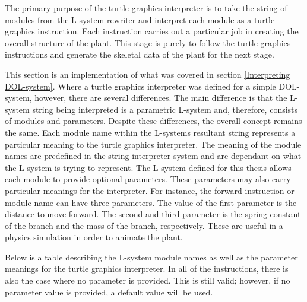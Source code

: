 The primary purpose of the turtle graphics interpreter is to take the string of modules from the L-system rewriter and interpret each module as a turtle graphics instruction. Each instruction carries out a particular job in creating the overall structure of the plant. This stage is purely to follow the turtle graphics instructions and generate the skeletal data of the plant for the next stage.

This section is an implementation of what was covered in section \ref{Interpreting DOL-system}. Where a turtle graphics interpreter was defined for a simple DOL-system, however, there are several differences. The main difference is that the L-system string being interpreted is a parametric L-system and, therefore, consists of modules and parameters. Despite these differences, the overall concept remains the same. Each module name within the L-systems resultant string represents a particular meaning to the turtle graphics interpreter. The meaning of the module names are predefined in the string interpreter system and are dependant on what the L-system is trying to represent. The L-system defined for this thesis allows each module to provide optional parameters. These parameters may also carry particular meanings for the interpreter. For instance, the forward instruction or module name  can have three parameters. The value of the first parameter is the distance to move forward. The second and third parameter is the spring constant of the branch and the mass of the branch, respectively. These are useful in a physics simulation in order to animate the plant. 

Below is a table describing the L-system module names as well as the parameter meanings for the turtle graphics interpreter. In all of the instructions, there is also the case where no parameter is provided. This is still valid; however, if no parameter value is provided, a default value will be used.

